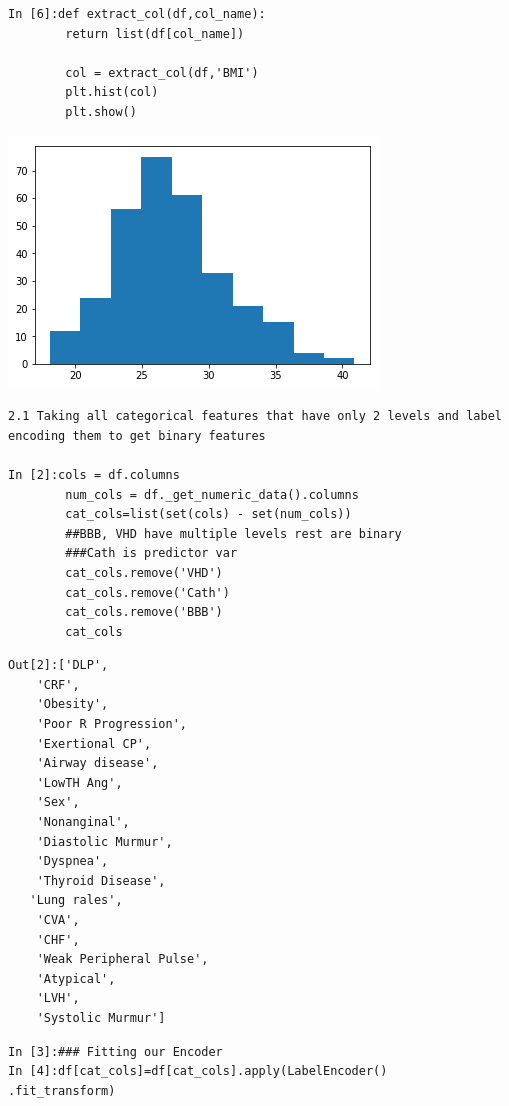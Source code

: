 \documentclass[sigconf]{acmart}
\begin{document}
\begin{lstlisting}
In [6]:def extract_col(df,col_name):
        return list(df[col_name])

        col = extract_col(df,'BMI') 
        plt.hist(col)
        plt.show()
\end{lstlisting}
\includegraphics[width=0.95\columnwidth]{project/output_2_0.png}

\begin{lstlisting}
2.1 Taking all categorical features that have only 2 levels and label encoding them to get binary features

In [2]:cols = df.columns
        num_cols = df._get_numeric_data().columns
        cat_cols=list(set(cols) - set(num_cols))
        ##BBB, VHD have multiple levels rest are binary
        ###Cath is predictor var
        cat_cols.remove('VHD')
        cat_cols.remove('Cath')
        cat_cols.remove('BBB')
        cat_cols
\end{lstlisting}

\begin{lstlisting}
Out[2]:['DLP',
    'CRF',
    'Obesity',
    'Poor R Progression',
    'Exertional CP',
    'Airway disease',
    'LowTH Ang',
    'Sex',
    'Nonanginal',
    'Diastolic Murmur',
    'Dyspnea',
    'Thyroid Disease',
   'Lung rales',
    'CVA',
    'CHF',
    'Weak Peripheral Pulse',
    'Atypical',
    'LVH',
    'Systolic Murmur']
\end{lstlisting}

\begin{lstlisting}
In [3]:### Fitting our Encoder
In [4]:df[cat_cols]=df[cat_cols].apply(LabelEncoder()
.fit_transform)
\end{lstlisting}
\end{document}
